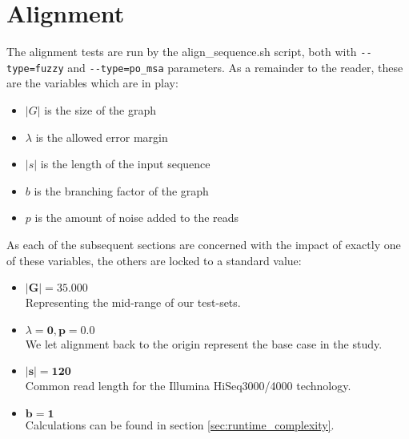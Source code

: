 \documentclass[thesis.tex]{subfiles}
\begin{document}
\section{Alignment}
The alignment tests are run by the align\_sequence.sh script, both with \texttt{-{}-type=fuzzy} and \texttt{-{}-type=po\_msa} parameters. As a remainder to the reader, these are the variables which are in play:
\begin{itemize}
  \item $|G|$ is the size of the graph
  \item $\lambda$ is the allowed error margin
  \item $|s|$ is the length of the input sequence
  \item $b$ is the branching factor of the graph
  \item $p$ is the amount of noise added to the reads
\end{itemize}
As each of the subsequent sections are concerned with the impact of exactly one of these variables, the others are locked to a standard value:
\begin{itemize}
  \item $\mathbf{|G|=35.000}$ \\Representing the mid-range of our test-sets.
  \item $\lambda\mathbf{=0, p=0.0}$ \\We let alignment back to the origin represent the base case in the study.
  \item $\mathbf{|s|=120}$ \\Common read length for the Illumina HiSeq3000/4000 technology.
  \item $\mathbf{b=1}$ \\Calculations can be found in section \ref{sec:runtime_complexity}.
\end{itemize}
\end{document}
